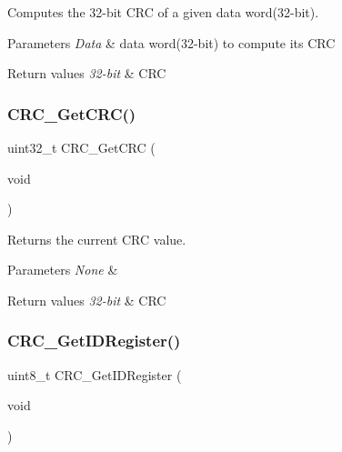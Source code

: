 Computes the 32-\/bit C\+RC of a given data word(32-\/bit). 


\begin{DoxyParams}{Parameters}
{\em Data} & data word(32-\/bit) to compute its C\+RC \\
\hline
\end{DoxyParams}

\begin{DoxyRetVals}{Return values}
{\em 32-\/bit} & C\+RC \\
\hline
\end{DoxyRetVals}
\mbox{\label{group___c_r_c___private___functions_gab62db4561b0558f3c8ed53887fe7de8b}} 
\subsubsection{\texorpdfstring{CRC\_GetCRC()}{CRC\_GetCRC()}}
{\footnotesize\ttfamily uint32\+\_\+t C\+R\+C\+\_\+\+Get\+C\+RC (\begin{DoxyParamCaption}\item[{void}]{ }\end{DoxyParamCaption})}



Returns the current C\+RC value. 


\begin{DoxyParams}{Parameters}
{\em None} & \\
\hline
\end{DoxyParams}

\begin{DoxyRetVals}{Return values}
{\em 32-\/bit} & C\+RC \\
\hline
\end{DoxyRetVals}
\mbox{\label{group___c_r_c___private___functions_gaf869f6e9c3ca0ae0822cfad1abea7e5f}} 
\subsubsection{\texorpdfstring{CRC\_GetIDRegister()}{CRC\_GetIDRegister()}}
{\footnotesize\ttfamily uint8\+\_\+t C\+R\+C\+\_\+\+Get\+I\+D\+Register (\begin{DoxyParamCaption}\item[{void}]{ }\end{DoxyParamCaption})}



